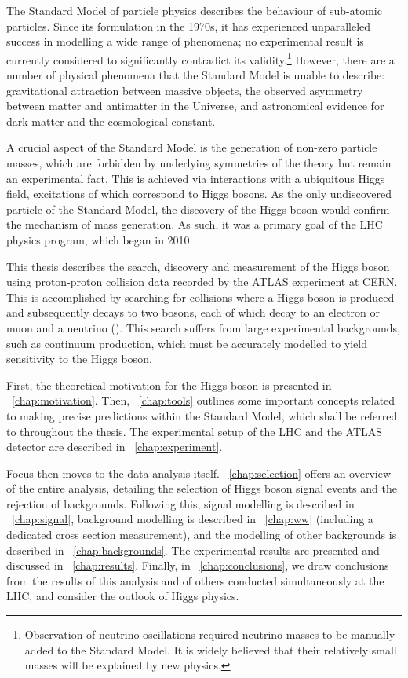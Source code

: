 
The Standard Model of particle physics describes the behaviour of sub-atomic particles. 
Since its formulation in the 1970s, it has experienced unparalleled success in modelling a 
wide range of phenomena; no experimental result is currently considered to significantly 
contradict its validity.\footnote{
	Observation of neutrino oscillations required neutrino masses to be manually added to 
	the Standard Model. It is widely believed that their relatively small masses will be 
	explained by new physics.
}
However, there are a number of physical phenomena that the Standard Model is unable to 
describe: gravitational attraction between massive objects, the observed asymmetry between 
matter and antimatter in the Universe, and astronomical evidence for dark matter and the 
cosmological constant.

A crucial aspect of the Standard Model is the generation of non-zero particle masses, which 
are forbidden by underlying symmetries of the theory but remain an experimental fact. This 
is achieved via interactions with a ubiquitous Higgs field, excitations of which correspond 
to Higgs bosons. As the only undiscovered particle of the Standard Model, the discovery of 
the Higgs boson would confirm the mechanism of mass generation. As such, it was a primary 
goal of the LHC physics program, which began in 2010.

This thesis describes the search, discovery and measurement of the Higgs boson using 
proton-proton collision data recorded by the ATLAS experiment at CERN. This is accomplished 
by searching for collisions where a Higgs boson is produced and subsequently decays to two 
\PW bosons, each of which decay to an electron or muon and a neutrino (\ie \HWWlvlv). This 
search suffers from large experimental backgrounds, such as continuum \WW production, which 
must be accurately modelled to yield sensitivity to the Higgs boson.

First, the theoretical motivation for the Higgs boson is presented in 
\Chapter~\ref{chap:motivation}. Then, \Chapter~\ref{chap:tools} outlines some important 
concepts related to making precise predictions within the Standard Model, which shall be 
referred to throughout the thesis. The experimental setup of the LHC and the ATLAS detector 
are described in \Chapter~\ref{chap:experiment}.

Focus then moves to the data analysis itself. \Chapter~\ref{chap:selection} offers an 
overview of the entire \HWW analysis, detailing the selection of Higgs boson signal events 
and the rejection of backgrounds. Following this, signal modelling is described in 
\Chapter~\ref{chap:signal}, \WW background modelling is described in \Chapter~\ref{chap:ww} 
(including a dedicated cross section measurement), and the modelling of other backgrounds is 
described in \Chapter~\ref{chap:backgrounds}. The experimental results are presented and 
discussed in \Chapter~\ref{chap:results}. Finally, in \Chapter~\ref{chap:conclusions}, we 
draw conclusions from the results of this analysis and of others conducted simultaneously at 
the LHC, and consider the outlook of Higgs physics.


